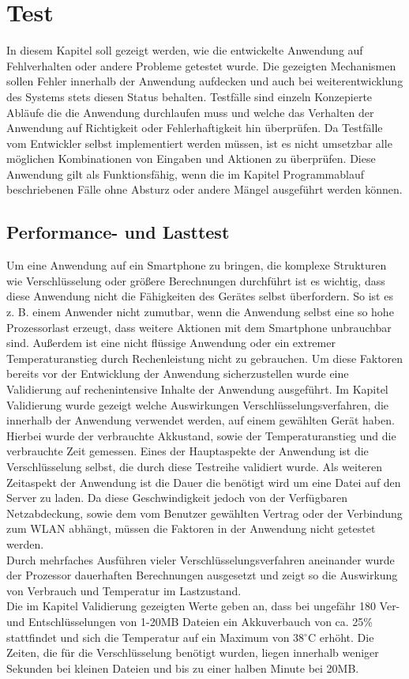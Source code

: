 \documentclass[10pt, a4paper]{scrreprt}
\begin{document}
\chapter{Test}
In diesem Kapitel soll gezeigt werden, wie die entwickelte Anwendung auf Fehlverhalten oder andere Probleme getestet wurde. Die gezeigten Mechanismen sollen Fehler innerhalb der Anwendung aufdecken und auch bei weiterentwicklung des Systems stets diesen Status behalten. Testfälle sind einzeln Konzepierte Abläufe die die Anwendung durchlaufen muss und welche das Verhalten der Anwendung auf Richtigkeit oder Fehlerhaftigkeit hin überprüfen. Da Testfälle vom Entwickler selbst implementiert werden müssen, ist es nicht umsetzbar alle möglichen Kombinationen von Eingaben und Aktionen zu überprüfen. Diese Anwendung gilt als Funktionsfähig, wenn die im Kapitel Programmablauf beschriebenen Fälle ohne Absturz oder andere Mängel ausgeführt werden können.


\section{Performance- und Lasttest}
Um eine Anwendung auf ein Smartphone zu bringen, die komplexe Strukturen wie Verschlüsselung oder größere Berechnungen durchführt ist es wichtig, dass diese Anwendung nicht die Fähigkeiten des Gerätes selbst überfordern. So ist es z. B. einem Anwender nicht zumutbar, wenn die Anwendung selbst eine so hohe Prozessorlast erzeugt, dass weitere Aktionen mit dem Smartphone unbrauchbar sind. Außerdem ist eine nicht flüssige Anwendung oder ein extremer Temperaturanstieg durch Rechenleistung nicht zu gebrauchen. Um diese Faktoren bereits vor der Entwicklung der Anwendung sicherzustellen wurde eine Validierung auf rechenintensive Inhalte der Anwendung ausgeführt. Im Kapitel Validierung wurde gezeigt welche Auswirkungen Verschlüsselungsverfahren, die innerhalb der Anwendung verwendet werden, auf einem gewählten Gerät haben. Hierbei wurde der verbrauchte Akkustand, sowie der Temperaturanstieg und die verbrauchte Zeit gemessen. Eines der Hauptaspekte der Anwendung ist die Verschlüsselung selbst, die durch diese Testreihe validiert wurde. Als weiteren Zeitaspekt der Anwendung ist die Dauer die benötigt wird um eine Datei auf den Server zu laden. Da diese Geschwindigkeit jedoch von der Verfügbaren Netzabdeckung, sowie dem vom Benutzer gewählten Vertrag oder der Verbindung zum WLAN abhängt,  müssen die Faktoren in der Anwendung nicht getestet werden. \\
Durch mehrfaches Ausführen vieler Verschlüsselungsverfahren aneinander wurde der Prozessor dauerhaften Berechnungen ausgesetzt und zeigt so die Auswirkung von Verbrauch und Temperatur im Lastzustand. \\
Die im Kapitel Validierung gezeigten Werte geben an, dass bei ungefähr 180 Ver- und Entschlüsselungen von 1-20MB Dateien ein Akkuverbauch von ca. 25\% stattfindet und sich die Temperatur auf ein Maximum von 38$^\circ$C erhöht. Die Zeiten, die für die Verschlüsselung benötigt wurden, liegen innerhalb weniger Sekunden bei kleinen Dateien und bis zu einer halben Minute bei 20MB. 
\end{document}
